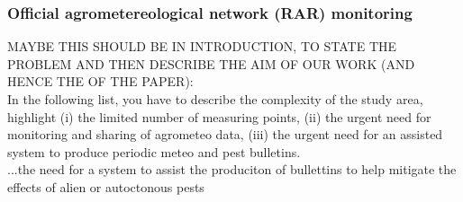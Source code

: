 \documentclass[authoryear,preprint,review,12pt]{elsarticle}
\begin{document}
\subsubsection{Official agrometereological network (RAR) monitoring}\label{RARStructure}

MAYBE THIS SHOULD BE IN INTRODUCTION, TO STATE THE PROBLEM AND THEN DESCRIBE THE AIM OF OUR WORK (AND HENCE THE OF THE PAPER):\\
In the following list, you have to describe the complexity of the study area, highlight (i) the limited number of measuring points, (ii) the urgent need for monitoring and sharing of agrometeo data, (iii) the urgent need for an assisted system to produce periodic meteo and pest bulletins.\\
...the need for a system to assist the produciton of bullettins to help mitigate the effects of alien or autoctonous pests\\
\end{document}
